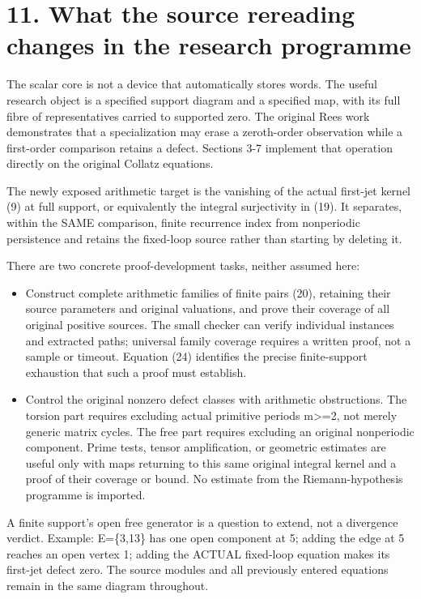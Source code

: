 \section{11. What the source rereading changes in the research
programme}

The scalar core is not a device that automatically stores words. The
useful research object is a specified support diagram and a specified
map, with its full fibre of representatives carried to supported zero.
The original Rees work demonstrates that a specialization may erase a
zeroth-order observation while a first-order comparison retains a
defect. Sections 3-7 implement that operation directly on the original
Collatz equations.

The newly exposed arithmetic target is the vanishing of the actual
first-jet kernel (9) at full support, or equivalently the integral
surjectivity in (19). It separates, within the SAME comparison, finite
recurrence index from nonperiodic persistence and retains the fixed-loop
source rather than starting by deleting it.

There are two concrete proof-development tasks, neither assumed here:

\begin{itemize}
\tightlist
\item
  Construct complete arithmetic families of finite pairs (20), retaining
  their source parameters and original valuations, and prove their
  coverage of all original positive sources. The small checker can
  verify individual instances and extracted paths; universal family
  coverage requires a written proof, not a sample or timeout. Equation
  (24) identifies the precise finite-support exhaustion that such a
  proof must establish.
\item
  Control the original nonzero defect classes with arithmetic
  obstructions. The torsion part requires excluding actual primitive
  periods m\textgreater=2, not merely generic matrix cycles. The free
  part requires excluding an original nonperiodic component. Prime
  tests, tensor amplification, or geometric estimates are useful only
  with maps returning to this same original integral kernel and a proof
  of their coverage or bound. No estimate from the Riemann-hypothesis
  programme is imported.
\end{itemize}

A finite support's open free generator is a question to extend, not a
divergence verdict. Example: E=\{3,13\} has one open component at 5;
adding the edge at 5 reaches an open vertex 1; adding the ACTUAL
fixed-loop equation makes its first-jet defect zero. The source modules
and all previously entered equations remain in the same diagram
throughout.

